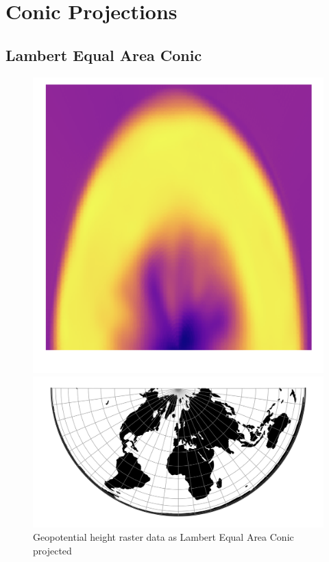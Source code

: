 \newpage
\section{Conic Projections}
\subsection{Lambert Equal Area Conic}
\begin{figure}[H]
    \centering
    \begin{minipage}{0.30\textwidth}
        \centering
        \includegraphics[width=0.9\linewidth]{figures/chapter-8/geopoth_leac.png}
        \caption{ Geopotential height raster data as Lambert Equal Area Conic projected}
        \label{fig:leac_geopoth_raster}
    \end{minipage}\hfill
    \begin{minipage}{0.30\textwidth}
        \centering
        \includegraphics[width=0.9\linewidth]{figures/chapter-8/leac.png}

\end{minipage}
\end{figure}
